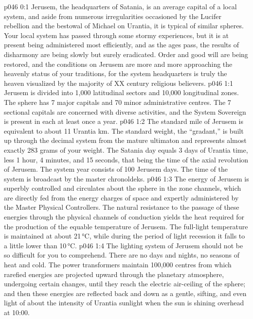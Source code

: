 \author{Archangel}
\vs p046 0:1 Jerusem, the headquarters of Satania, is an average capital of a local system, and aside from numerous irregularities occasioned by the Lucifer rebellion and the bestowal of Michael on Urantia, it is typical of similar spheres. Your local system has passed through some stormy experiences, but it is at present being administered most efficiently, and as the ages pass, the results of disharmony are being slowly but surely eradicated. Order and good will are being restored, and the conditions on Jerusem are more and more approaching the heavenly status of your traditions, for the system headquarters is truly the heaven visualized by the majority of XX century religious believers.
\vs p046 1:1 Jerusem is divided into 1,000 latitudinal sectors and 10,000 longitudinal zones. The sphere has 7 major capitals and 70 minor administrative centres. The 7 sectional capitals are concerned with diverse activities, and the System Sovereign is present in each at least once a year.
\vs p046 1:2 \pc The standard mile of Jerusem is equivalent to about 11 Urantia km. The standard weight, the “gradant,” is built up through the decimal system from the mature ultimaton and represents almost exactly 283 grams of your weight. The Satania day equals 3 days of Urantia time, less 1 hour, 4 minutes, and 15 seconds, that being the time of the axial revolution of Jerusem. The system year consists of 100 Jerusem days. The time of the system is broadcast by the master chronoldeks.
\vs p046 1:3 \pc The energy of Jerusem is superbly controlled and circulates about the sphere in the zone channels, which are directly fed from the energy charges of space and expertly administered by the Master Physical Controllers. The natural resistance to the passage of these energies through the physical channels of conduction yields the heat required for the production of the equable temperature of Jerusem. The full\hyp{}light temperature is maintained at about 21\,°C, while during the period of light recession it falls to a little lower than 10\,°C.
\vs p046 1:4 \pc The lighting system of Jerusem should not be so difficult for you to comprehend. There are no days and nights, no seasons of heat and cold. The power transformers maintain 100,000 centres from which rarefied energies are projected upward through the planetary atmosphere, undergoing certain changes, until they reach the electric air\hyp{}ceiling of the sphere; and then these energies are reflected back and down as a gentle, sifting, and even light of about the intensity of Urantia sunlight when the sun is shining overhead at 10:00.
